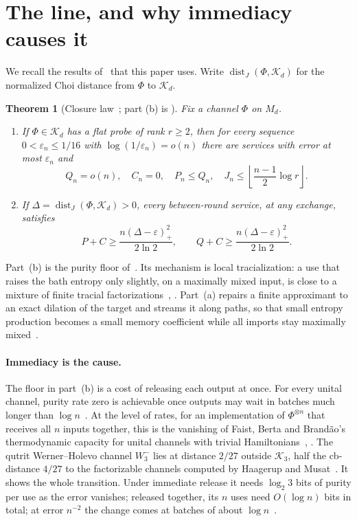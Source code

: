 \documentclass[11pt]{article}
\newtheorem{theorem}{Theorem}
\theoremstyle{definition}
\theoremstyle{remark}
\DeclareMathOperator{\dist}{dist}
\newcommand{\K}{\mathcal K}
\newcommand{\Wminus}{W_3^-}
\newcommand{\eps}{\varepsilon}
\begin{document}
\section{The line, and why immediacy causes it}\label{sec:line}

We recall the results of~\cite{Memory,Law} that this paper uses. Write $\dist_J(\Phi,\K_d)$ for the normalized Choi distance from $\Phi$ to $\K_d$.

\begin{theorem}[Closure law~{\cite[Theorem~4.1]{Law}}; part (b) is {\cite[Theorem~3.2(b)]{Memory}}]\label{thm:closure}
Fix a channel $\Phi$ on $M_d$.
\begin{enumerate}[label=(\alph*),itemsep=3pt]
\item If $\Phi\in\K_d$ has a flat probe of rank $r\ge2$, then for every sequence $0<\eps_n\le1/16$ with $\log(1/\eps_n)=o(n)$ there are services with error at most $\eps_n$ and
\[
 Q_n=o(n),\quad C_n=0,\quad P_n\le Q_n,\quad
 J_n\le\left\lfloor\frac{n-1}{2}\log r\right\rfloor.
\]
\item If $\Delta=\dist_J(\Phi,\K_d)>0$, every between-round service, at any exchange, satisfies
\begin{equation}\label{eq:floor}
 P+C\ge\frac{n(\Delta-\eps)_+^2}{2\ln2},\qquad
 Q+C\ge\frac{n(\Delta-\eps)_+^2}{2\ln2}.
\end{equation}
\end{enumerate}
\end{theorem}

Part~(b) is the purity floor of~\cite[Theorem~3.2(b)]{Memory}. Its mechanism is local tracialization: a use that raises the bath entropy only slightly, on a maximally mixed input, is close to a mixture of finite tracial factorizations~\cite[Lemma~5.4]{Memory}, \cite[Lemma~4.5]{Law}. Part~(a) repairs a finite approximant to an exact dilation of the target and streams it along paths, so that small entropy production becomes a small memory coefficient while all imports stay maximally mixed~\cite[Appendix~B]{Law}.

\paragraph{Immediacy is the cause.}
The floor in part~(b) is a cost of releasing each output at once. For every unital channel, purity rate zero is achievable once outputs may wait in batches much longer than $\log n$~\cite[Theorem~3.5]{Law}. At the level of rates, for an implementation of $\Phi^{\otimes n}$ that receives all $n$ inputs together, this is the vanishing of Faist, Berta and Brand\~ao's thermodynamic capacity for unital channels with trivial Hamiltonians~\cite{FaistBertaBrandao}, \cite[Equation~(4.9) and Theorem~7.1]{FaistBertaBrandao2021}. The qutrit Werner--Holevo channel $\Wminus$ lies at distance $2/27$ outside $\K_3$, half the cb-distance $4/27$ to the factorizable channels computed by Haagerup and Musat~\cite[Theorem~5.6(2)]{HM2015}. It shows the whole transition. Under immediate release it needs $\log_2 3$ bits of purity per use as the error vanishes; released together, its $n$ uses need $O(\log n)$ bits in total; at error $n^{-2}$ the change comes at batches of about $\log n$~\cite[Theorems~3.1, 3.3 and~3.4]{Law}.
\end{document}
